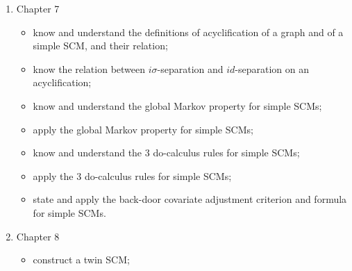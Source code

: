 \begin{enumerate}
\begin{itemize}
    \item understand the different equivalence relations for SCMs (see also Chapter 8);
    \item know and understand the definition of marginalization of SCMs;
    \item construct a marginalized SCM;
    \item know and apply the basic commutation and compatibility properties of basic operations on SCMs (intervening, marginalization, preservation of unique solvability / simplicity / equivalence);
    \item know and understand the definition of the graph of an SCM;
    \item be able to draw the graph of a given SCM, and to construct an SCM with a given graph;
    \item know and apply the basic compatibility relations between the operation that maps an SCM to a graph and other basic SCM operations;
    \item give a causal interpretation of the graph of an SCM (see Chapter 9);
    \item know the definition of acyclic SCM;
    \item understand and appreciate the differences between different causal model classes.
  \end{itemize}
  \item Chapter 7
    \begin{itemize}
      \item know and understand the definitions of acyclification of a graph and of a simple SCM, and their relation;
      \item know the relation between $i\sigma$-separation and $id$-separation on an acyclification;
      \item know and understand the global Markov property for simple SCMs;
      \item apply the global Markov property for simple SCMs;
      \item know and understand the 3 do-calculus rules for simple SCMs;
      \item apply the 3 do-calculus rules for simple SCMs;
      \item state and apply the back-door covariate adjustment criterion and formula for simple SCMs.
    \end{itemize}
  \item Chapter 8
    \begin{itemize}
      \item construct a twin SCM;

\end{itemize}
\end{enumerate}
